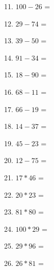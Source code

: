 \documentclass[12pt]{article}
\begin{document}
11. $100 - 26$ = \underline{\hspace{2 in}}




12. $29 - 74$ = \underline{\hspace{2 in}}




13. $39 - 50$ = \underline{\hspace{2 in}}




14. $91 - 34$ = \underline{\hspace{2 in}}




15. $18 - 90$ = \underline{\hspace{2 in}}




16. $68 - 11$ = \underline{\hspace{2 in}}




17. $66 - 19$ = \underline{\hspace{2 in}}




18. $14 - 37$ = \underline{\hspace{2 in}}




19. $45 - 23$ = \underline{\hspace{2 in}}




20. $12 - 75$ = \underline{\hspace{2 in}}






21. $17 * 46$ = \underline{\hspace{2 in}}




22. $20 * 23$ = \underline{\hspace{2 in}}




23. $81 * 80$ = \underline{\hspace{2 in}}




24. $100 * 29$ = \underline{\hspace{2 in}}




25. $29 * 96$ = \underline{\hspace{2 in}}




26. $26 * 81$ = \underline{\hspace{2 in}}
\end{document}
